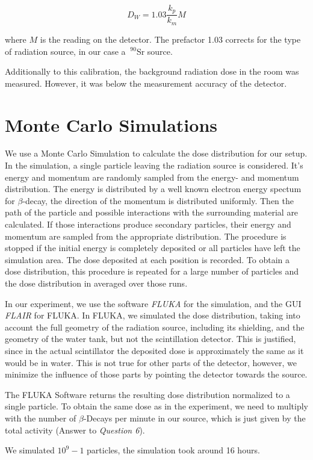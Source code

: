 \documentclass[a4paper,parskip]{scrartcl}
\begin{document}
$$D_W = 1.03\frac{k_p}{k_m}M$$

where $M$ is the reading on the detector. The prefactor 1.03 corrects for the type of radiation source, in our case a $~^{90}$Sr source.

Additionally to this calibration, the background radiation dose in the room was measured. However, it was below the measurement accuracy of the detector.

\section{Monte Carlo Simulations}
We use a Monte Carlo Simulation to calculate the dose distribution for our setup. In the simulation, a single particle leaving the radiation source is considered. It's energy and momentum are randomly sampled from the energy- and momentum distribution. The energy is distributed by a well known electron energy spectum for $\beta$-decay, the direction of the momentum is distributed uniformly. Then the path of the particle and possible interactions with the surrounding material are calculated. If those interactions produce secondary particles, their energy and momentum are sampled from the appropriate distribution. The procedure is stopped if the initial energy is completely deposited or all particles have left the simulation area. The dose deposited at each position is recorded. To obtain a dose distribution, this procedure is repeated for a large number of particles and the dose distribution in averaged over those runs.

In our experiment, we use the software \textit{FLUKA} for the simulation, and the GUI \textit{FLAIR} for FLUKA. In FLUKA, we simulated the dose distribution, taking into account the full geometry of the radiation source, including its shielding, and the geometry of the water tank, but not the scintillation detector. This is justified, since in the actual scintillator the deposited dose is approximately the same as it would be in water. This is not true for other parts of the detector, however, we minimize the influence of those parts by pointing the detector towards the source.

The FLUKA Software returns the resulting dose distribution normalized to a single particle. To obtain the same dose as in the experiment, we need to multiply with the number of $\beta$-Decays per minute in our source, which is just given by the total activity (Answer to \textit{Question 6}).

We simulated $10^9-1$ particles, the simulation took around 16 hours.
\end{document}
